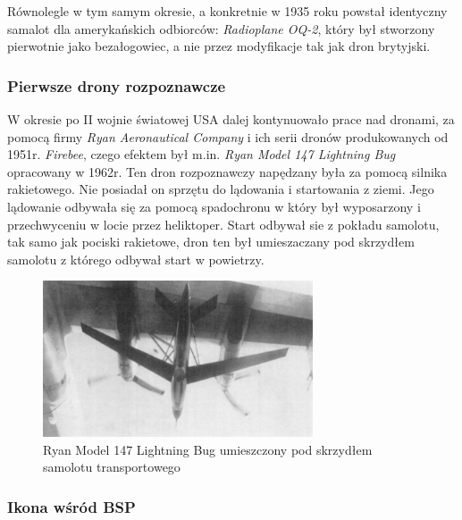 Równolegle w tym samym okresie, a konkretnie w 1935 roku powstał identyczny samalot dla amerykańskich odbiorców: \textit{Radioplane OQ-2}, który był stworzony pierwotnie jako bezałogowiec, a nie przez modyfikacje tak jak dron brytyjski.

\subsubsection{Pierwsze drony rozpoznawcze}
\hspace{1cm}W okresie po II wojnie światowej USA dalej kontynuowało prace nad dronami, za pomocą firmy \textit{Ryan Aeronautical Company} i ich serii dronów produkowanych od 1951r. \textit{Firebee}, czego efektem był m.in. \textit{Ryan Model 147 Lightning Bug} opracowany w 1962r. Ten dron rozpoznawczy napędzany była za pomocą silnika rakietowego. Nie posiadał on sprzętu do lądowania i startowania z ziemi. Jego lądowanie odbywała się za pomocą spadochronu w który był wyposarzony i przechwyceniu w locie przez heliktoper. Start odbywał sie z pokładu samolotu, tak samo jak pociski rakietowe, dron ten był umieszaczany pod skrzydłem samolotu z którego odbywał start w powietrzy.\cite{dron-ibuk}\cite{firebee-wiki}


\begin{figure}[!ht]
  \centering
  \includegraphics[width=8cm]{./Obrazy/Model_147_RPV.png}
  \caption{Ryan Model 147 Lightning Bug umieszczony pod skrzydłem samolotu transportowego}
  \end{figure}

\subsubsection{Ikona wśród BSP}

